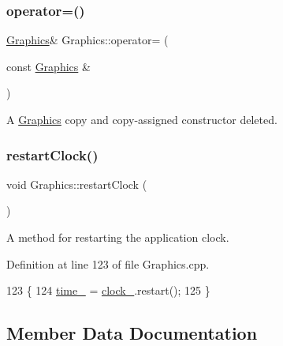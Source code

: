 \subsubsection{\texorpdfstring{operator=()}{operator=()}}
{\footnotesize\ttfamily \hyperlink{classGraphics}{Graphics}\& Graphics\+::operator= (\begin{DoxyParamCaption}\item[{const \hyperlink{classGraphics}{Graphics} \&}]{ }\end{DoxyParamCaption})\hspace{0.3cm}{\ttfamily [delete]}}



A \hyperlink{classGraphics}{Graphics} copy and copy-\/assigned constructor deleted. 

\mbox{\label{classGraphics_abb78da7bc406f5c9518f7fd3f20b42f8}} 
\subsubsection{\texorpdfstring{restart\+Clock()}{restartClock()}}
{\footnotesize\ttfamily void Graphics\+::restart\+Clock (\begin{DoxyParamCaption}{ }\end{DoxyParamCaption})}



A method for restarting the application clock. 



Definition at line 123 of file Graphics.\+cpp.


\begin{DoxyCode}
123                             \{
124     \hyperlink{classGraphics_ab2983b7d90351c0f7b824ac6f887fd6d}{time\_} = \hyperlink{classGraphics_ad9850d50fe5792666c8aea88f39ba99c}{clock\_}.restart();
125 \}
\end{DoxyCode}


\subsection{Member Data Documentation}
\mbox{\label{classGraphics_a44d7a76a58e03b8ad3f025123894c526}} 
